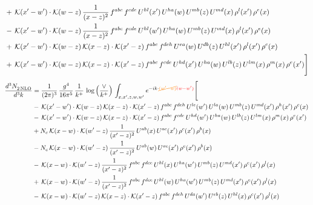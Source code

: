 \documentclass[9pt]{article}
\numberwithin{equation}{section}
\begin{document}
\begin{align}
&+\,\mathcal{K}(x'-w')\cdot\mathcal{K}(w-z)\,\frac{1}{(x-z)^{2}}\,f^{abc}\,f^{cde}\,U^{hl}(x')\,U^{ha}(w)\,U^{mb}(z)\,U^{md}(x)\,\rho^{l}(x')\,\rho^{e}(x)\notag \\ 
&-\,\mathcal{K}(x'-w')\cdot\mathcal{K}(w-z)\,\frac{1}{(x-z)^{2}}\,f^{abc}\,f^{cde}\,U^{hl}(w')\,U^{ha}(w)\,U^{mb}(z)\,U^{md}(x)\,\rho^{l}(x')\,\rho^{e}(x)\notag \\ 
&+\,\mathcal{K}(x'-w')\cdot\mathcal{K}(w-z)\,\mathcal{K}(x-z)\cdot\mathcal{K}(x'-z)\,f^{abc}\,f^{deh}\,U^{ea}(w)\,U^{db}(z)\,U^{hl}(x')\,\rho^{l}(x')\,\rho^{c}(x)\notag \\ 
&+\,\mathcal{K}(x'-w')\cdot\mathcal{K}(w-z)\,\mathcal{K}(x-z)\cdot\mathcal{K}(x'-z)\,f^{abc}\,f^{cde}\,U^{hd}(x')\,U^{ha}(w)\,U^{lb}(z)\,U^{lm}(x)\,\rho^{m}(x)\,\rho^{e}(x')\Bigg]
\end{align}    
\begin{align}
    \frac{d^{3}N_{2\,\rm NLO}^{\rm}}{d^{3}k}  & = \frac{1}{(2\pi)^{3}}\,\frac{g^{4}}{16\pi^{5}}\,\frac{1}{k^{+}}\,\log{\left(\frac{\vee}{k^{+}}\right)}\, \int_{x,x',z,w,w'}e^{-ik\cdot{\color{orange}\cancel{(w'-w)}}{\color{red}(w-w')}}\Bigg[\notag\\ & -\,\mathcal{K}(x'-w')\cdot\mathcal{K}(w-z)\,\mathcal{K}(x-z)\cdot\mathcal{K}(x'-z)\,f^{abc}\,f^{deh}\,U^{le}(w')\,U^{la}(w)\,U^{mb}(z)\,U^{md}(x')\,\rho^{h}(x')\,\rho^{c}(x)\notag \\ 
&-\,\mathcal{K}(x'-w')\cdot\mathcal{K}(w-z)\,\mathcal{K}(x-z)\cdot\mathcal{K}(x'-z)\,f^{abc}\,f^{cde}\,U^{hd}(w')\,U^{ha}(w)\,U^{lb}(z)\,U^{lm}(x)\,\rho^{m}(x)\,\rho^{e}(x')\notag \\ 
&+N_{c}\,\mathcal{K}(x-w)\cdot\mathcal{K}(w'-z)\,\frac{1}{(x'-z)^{2}}\,U^{ab}(x)\,U^{ac}(x')\,\rho^{c}(x')\,\rho^{b}(x)\notag \\ 
&-N_{c}\,\mathcal{K}(x-w)\cdot\mathcal{K}(w'-z)\,\frac{1}{(x'-z)^{2}}\,U^{ab}(w)\,U^{ac}(x')\,\rho^{c}(x')\,\rho^{b}(x)\notag \\ 
&-\,\mathcal{K}(x-w)\cdot\mathcal{K}(w'-z)\,\frac{1}{(x'-z)^{2}}\,f^{abc}\,f^{dce}\,U^{hl}(x)\,U^{ha}(w')\,U^{mb}(z)\,U^{md}(x')\,\rho^{e}(x')\,\rho^{l}(x) \notag \\ & +\,\mathcal{K}(x-w)\cdot\mathcal{K}(w'-z)\,\frac{1}{(x'-z)^{2}}\,f^{abc}\,f^{dce}\,U^{hl}(w)\,U^{ha}(w')\,U^{mb}(z)\,U^{md}(x')\,\rho^{e}(x')\,\rho^{l}(x)\notag \\ 
&-\,\mathcal{K}(x-w)\cdot\mathcal{K}(w'-z)\,\mathcal{K}(x-z)\cdot\mathcal{K}(x'-z)\,f^{abc}\,f^{deh}\,U^{da}(w')\,U^{eb}(z)\,U^{hl}(x)\,\rho^{c}(x')\,\rho^{l}(x)\notag \\ 

\end{align}
\end{document}
